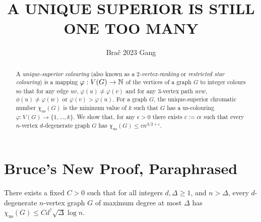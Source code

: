 \documentclass[kpfonts]{patmorin}
\title{\MakeUppercase{A Unique Superior is Still One Too Many}}
\author{Bra\v{c} 2023 Gang}
\newcommand{\defin}[1]{\emph{\color{brightmaroon}#1}}
\newcommand{\trn}{\chi_{\mathrm{us}}}
\begin{document}
\maketitle

\begin{abstract}
  A \defin{unique-superior colouring} (also known as a \defin{$2$-vertex-ranking} or \defin{restricted star colouring}) is a mapping $\varphi:V(G)\to\mathbb{N}$ of the vertices of a graph $G$ to integer colours so that for any edge $uv$, $\varphi(u)\neq \varphi(v)$ and for any $3$-vertex path $uvw$, $\phi(u)\neq\varphi(w)$ or $\varphi(v)>\varphi(u)$.  For a graph $G$, the unique-superior chromatic number $\trn(G)$ is the minimum value of $k$ such that $G$ has a us-colouring $\varphi:V(G)\to\{1,\ldots,k\}$.  We show that, for any $\epsilon >0$ there exists $c:=c\epsilon$ such that every $n$-vertex $d$-degenerate graph $G$ has $\trn(G) \le c n^{3/2+\epsilon}$.
\end{abstract}


%


\section{Bruce's New Proof, Paraphrased}


\begin{thm}
  There exists a fixed $C>0$ such that
  for all integers $d,\Delta \ge 1$, and $n> \Delta$, every $d$-degenerate $n$-vertex graph $G$ of maximum degree at most $\Delta$ has
  $\trn(G)\leq C d^?\sqrt{\Delta}\log n$.
\end{thm}
\end{document}
